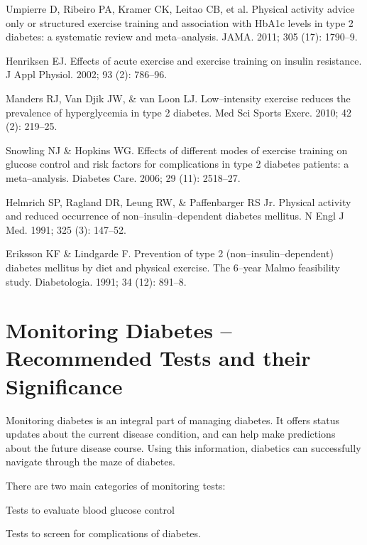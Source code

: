 \begin{thebibliography}{99}
 Umpierre D, Ribeiro PA, Kramer CK, Leitao CB, et al. Physical activity advice only or structured exercise training and association with HbA1c levels in type 2 diabetes: a systematic review and meta–analysis. JAMA. 2011; 305 (17): 1790–9.

  Henriksen EJ. Effects of acute exercise and exercise training on insulin resistance. J Appl Physiol. 2002; 93 (2): 786–96.

  Manders RJ, Van Djik JW, \& van Loon LJ. Low–intensity exercise reduces the prevalence of hyperglycemia in type 2 diabetes. Med Sci Sports Exerc. 2010; 42 (2): 219–25.

  Snowling NJ \& Hopkins WG. Effects of different modes of exercise training on glucose control and risk factors for complications in type 2 diabetes patients: a meta–analysis. Diabetes Care. 2006; 29 (11): 2518–27.

  Helmrich SP, Ragland DR, Leung RW, \& Paffenbarger RS Jr. Physical activity and reduced occurrence of non–insulin–dependent diabetes mellitus. N Engl J Med. 1991; 325 (3): 147–52.

  Eriksson KF \& Lindgarde F. Prevention of type 2 (non–insulin–dependent) diabetes mellitus by diet and physical exercise. The 6–year Malmo feasibility study. Diabetologia. 1991; 34 (12): 891–8.

 \end{thebibliography}


\chapter{Monitoring Diabetes – Recommended Tests and their Significance}\label{chap24}

Monitoring diabetes is an integral part of managing diabetes. It offers status updates about the current disease condition, and can help make predictions about the future disease course. Using this information, diabetics can successfully navigate through the maze of diabetes.

There are two main categories of monitoring tests:

\item Tests to evaluate blood glucose control

 \item Tests to screen for complications of diabetes.

